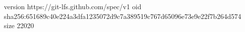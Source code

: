 version https://git-lfs.github.com/spec/v1
oid sha256:651689c40e224a3dfa1235072d9c7a389519c767d65096e73e9e22f7b264d574
size 22020
